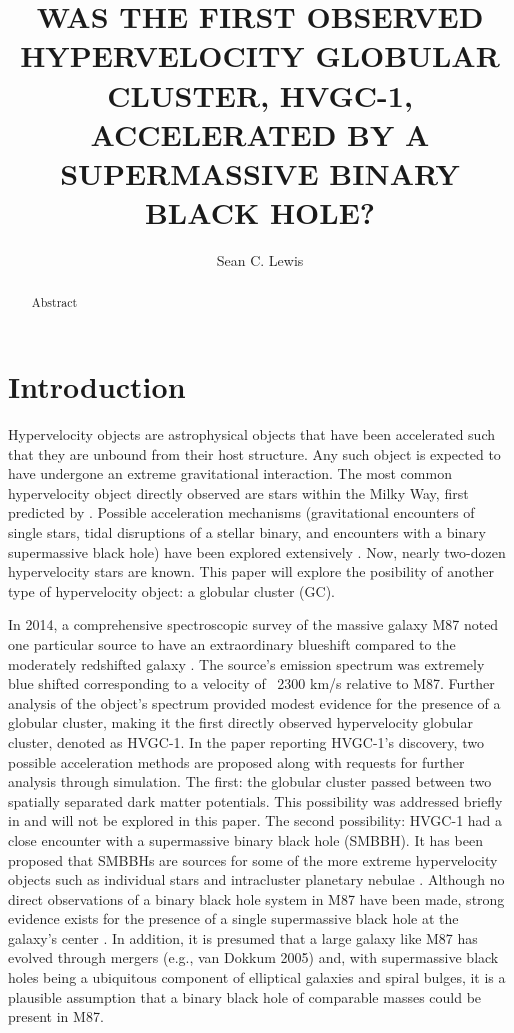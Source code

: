 \documentclass{aastex62}
\begin{document}
\title{WAS THE FIRST OBSERVED HYPERVELOCITY GLOBULAR CLUSTER, HVGC-1, ACCELERATED BY A SUPERMASSIVE BINARY BLACK HOLE?}

\author{Sean C. Lewis}



\begin{abstract}

Abstract

\end{abstract}
\section{Introduction} \label{sec:intro}
Hypervelocity objects are astrophysical objects that have been accelerated such that they are unbound from their host structure. Any such object is expected to have undergone an extreme gravitational interaction. The most common hypervelocity object directly observed are stars within the Milky Way, first predicted by \citet{hill88}.  Possible acceleration mechanisms (gravitational encounters of single stars, tidal disruptions of a stellar binary, and encounters with a binary supermassive black hole) have been explored extensively \citep{yutre03}. Now, nearly two-dozen hypervelocity stars are known. This paper will explore the posibility of another type of hypervelocity object: a globular cluster (GC). 

In 2014, a comprehensive spectroscopic survey of the massive galaxy M87 noted one particular source to have an extraordinary blueshift compared to the moderately redshifted galaxy \citep{cald14}. The source's emission spectrum was extremely blue shifted corresponding to a velocity of ~2300 km/s relative to M87. Further analysis of the object's spectrum provided modest evidence for the presence of a globular cluster, making it the first directly observed hypervelocity globular cluster, denoted as HVGC-1. In the paper reporting HVGC-1's discovery, two possible acceleration methods are proposed along with requests for further analysis through simulation. The first: the globular cluster passed between two spatially separated dark matter potentials. This possibility was addressed briefly in \citet{sam15} and will not be explored in this paper. The second possibility: HVGC-1 had a close encounter with a supermassive binary black hole (SMBBH). It has been proposed that SMBBHs are sources for some of the more extreme hypervelocity objects such as individual stars \citep{yutre03} and intracluster planetary nebulae \citep{hol05}. Although no direct observations of a binary black hole system in M87 have been made, strong evidence exists for the presence of a single supermassive black hole at the galaxy's center \citep{geb11}. In addition, it is presumed that a large galaxy like M87 has evolved through mergers (e.g., van Dokkum 2005) and, with supermassive black holes being a ubiquitous component of elliptical galaxies and spiral bulges, it is a plausible assumption that a binary black hole of comparable masses could be present in M87. 
\end{document}
